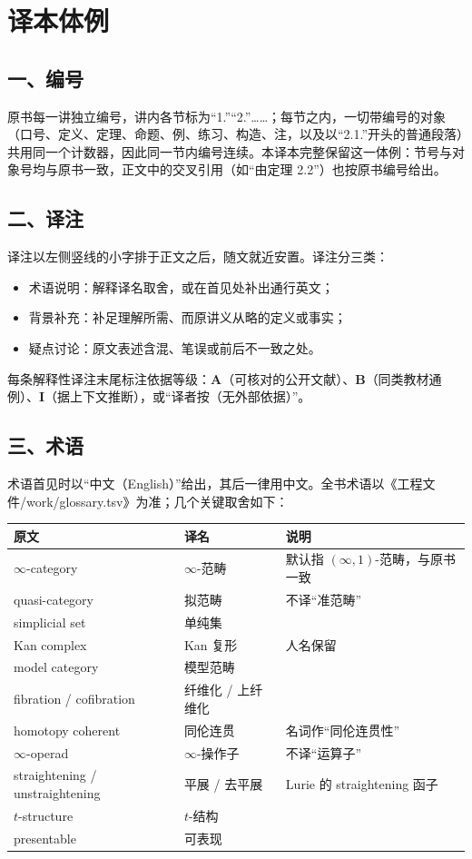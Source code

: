 \thispagestyle{plain}
\section*{译本体例}

\subsection*{一、编号}
原书每一讲独立编号，讲内各节标为“1.”“2.”……；每节之内，一切带编号的对象（口号、定义、定理、命题、例、练习、构造、注，以及以“2.1.”开头的普通段落）共用同一个计数器，因此同一节内编号连续。本译本完整保留这一体例：节号与对象号均与原书一致，正文中的交叉引用（如“由定理 2.2”）也按原书编号给出。

\subsection*{二、译注}
译注以左侧竖线的小字排于正文之后，随文就近安置。译注分三类：
\begin{itemize}[leftmargin=2.2em,itemsep=0.15em]
\item 术语说明：解释译名取舍，或在首见处补出通行英文；
\item 背景补充：补足理解所需、而原讲义从略的定义或事实；
\item 疑点讨论：原文表述含混、笔误或前后不一致之处。
\end{itemize}
每条解释性译注末尾标注依据等级：\textbf{A}（可核对的公开文献）、\textbf{B}（同类教材通例）、\textbf{I}（据上下文推断），或“译者按（无外部依据）”。

\subsection*{三、术语}
术语首见时以“中文（English）”给出，其后一律用中文。全书术语以《工程文件/work/glossary.tsv》为准；几个关键取舍如下：
\begin{center}
\small
\begin{tabular}{lll}
\toprule
原文 & 译名 & 说明\\
\midrule
$\infty$-category & $\infty$-范畴 & 默认指 $(\infty,1)$-范畴，与原书一致\\
quasi-category & 拟范畴 & 不译“准范畴”\\
simplicial set & 单纯集 & \\
Kan complex & Kan 复形 & 人名保留\\
model category & 模型范畴 & \\
fibration / cofibration & 纤维化 / 上纤维化 & \\
homotopy coherent & 同伦连贯 & 名词作“同伦连贯性”\\
$\infty$-operad & $\infty$-操作子 & 不译“运算子”\\
straightening / unstraightening & 平展 / 去平展 & Lurie 的 straightening 函子\\
$t$-structure & $t$-结构 & \\
presentable & 可表现 & \\
\bottomrule
\end{tabular}
\end{center}

